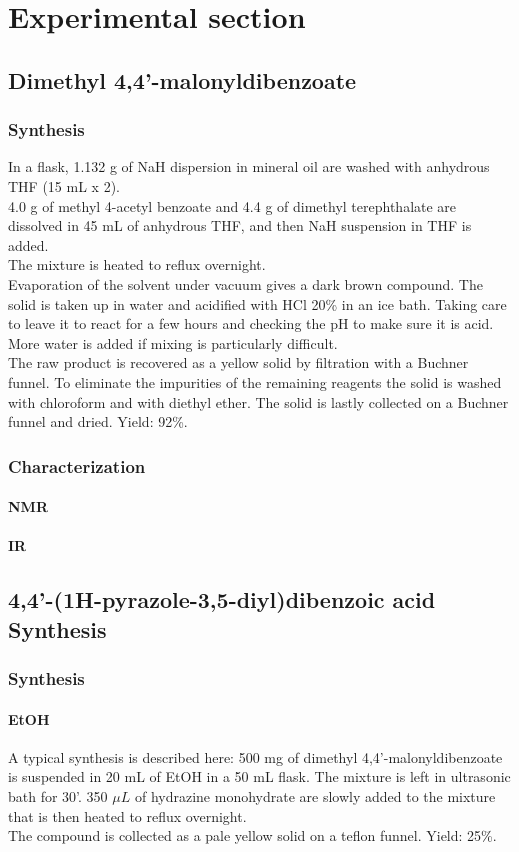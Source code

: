 \documentclass[../Master.tex]{subfiles}
\begin{document}
\chapter{Experimental section}
\section{Dimethyl 4,4'-malonyldibenzoate}
\subsection{Synthesis}
In a flask, 1.132 g of NaH dispersion in mineral oil are washed with anhydrous THF (15 mL x 2).\\
4.0 g of methyl 4-acetyl benzoate and 4.4 g of dimethyl terephthalate are dissolved in 45 mL of anhydrous THF, and then NaH suspension in THF is added.\\
The mixture is heated to reflux overnight. \\
Evaporation of the solvent under vacuum gives a dark brown compound. The solid is taken up in water and acidified with HCl 20\% in an ice bath. Taking care to leave it to react for a few hours and checking the pH to make sure it is acid. More water is added if mixing is particularly difficult.\\
The raw product is recovered as a yellow solid by filtration with a Buchner funnel.
To eliminate the impurities of the remaining reagents the solid is washed with chloroform and with diethyl ether. The solid is lastly collected on a Buchner funnel and dried. Yield: 92\%.
\subsection{Characterization}
\subsubsection{NMR}
\subsubsection{IR}
\section{4,4'-(1H-pyrazole-3,5-diyl)dibenzoic acid Synthesis}
\subsection{Synthesis}
\subsubsection{EtOH}
A typical synthesis is described here:
500 mg of dimethyl 4,4'-malonyldibenzoate is suspended in 20 mL of EtOH in a 50 mL flask. The mixture is left in ultrasonic bath for 30'. 350 \(\mu L\) of hydrazine monohydrate are slowly added to the mixture that is then heated to reflux overnight.\\
The compound is collected as a pale yellow solid on a teflon funnel. Yield: 25\%.
\end{document}
